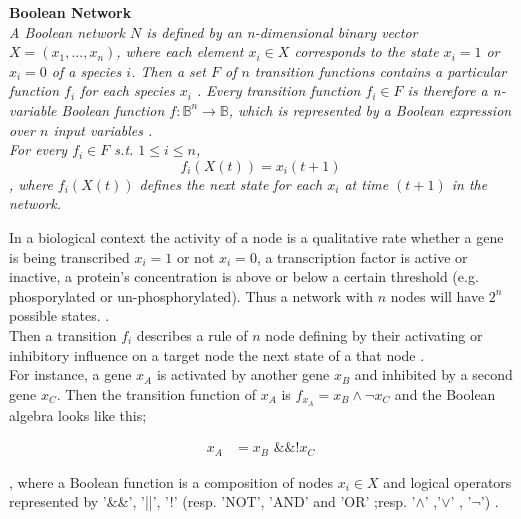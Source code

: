 \begin{defn}
\textbf{Boolean Network}\\
\textit{A Boolean network $N$ is defined by an n-dimensional binary vector $X=(x_{1},...,x_{n})$, where each element $x_{i}\in X$ corresponds to the state $x_{i}=1$ or $x_{i}=0$ of a species $i$. Then a set $F$ of $n$ transition functions contains a particular function $f_{i}$ for each species $x_{i}$ \citep{Berestovsky.2013}. 
Every transition function $f_{i} \in F$ is therefore a n-variable Boolean function $f:\mathbb{B}^{n} \rightarrow \mathbb{B} $, which is represented by a Boolean expression over $n$ input variables \citep{HannesKlarner.November2014}.
\\For every $f_{i}\in F$ s.t. $1\le i\le n$,
\begin{equation}
f_{i}(X(t))=x_{i}(t+1)
\end{equation}
, where $f_{i}(X(t))$ defines the next state for each $x_{i}$ at time $(t+1)$ in the network.}
\end{defn}


In a biological context the activity of a node is a qualitative rate whether a gene is being transcribed $x_{i}=1$ or not $x_{i}=0$, a transcription factor is active or inactive, a protein's concentration is above or below a certain threshold (e.g. phosporylated or un-phosphorylated). Thus a network with $n$ nodes will have $2^{n}$ possible states.
\citep{Saadatpour.2013}\citep{Lahdesmaki.2003}\citep{HannesKlarner.November2014T}.
\\
Then a transition $f_i$ describes a rule of $n$ node defining by their activating or inhibitory influence on a target node the next state of a that node \citep{Berestovsky.2013}.\\

For instance, a gene $x_{A}$ is activated by another gene $x_{B}$ and inhibited by a second gene $x_{C}$. Then the transition function of $x_A$ is $f_{x_{A}}=x_{B} \land  \neg x_{C}$ and the Boolean algebra looks like this;

\hspace{-15px}
\begin{equation}
\begin{split}
x_{A}& = x_{B} \text{ \&\&  !} x_{C} 
\end{split}
\end{equation}

, where a Boolean function is a composition of nodes $x_{i}\in X$ and logical operators represented by '\&\&', '||', '!' (resp. 'NOT', 'AND' and 'OR' ;resp. '$\land$' ,'$\lor$' , '$\neg$') \citep{Saadatpour.2013}\citep{Berestovsky.2013}. \\


